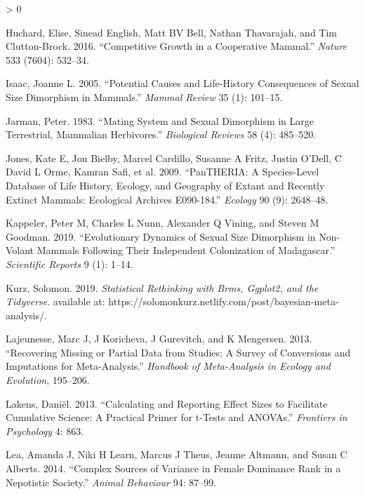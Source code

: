 \documentclass[
]{article}
\newlength{\cslhangindent}
\newenvironment{CSLReferences}[2] %
 {%
  \setlength{\parindent}{0pt}
  \ifodd #1 \everypar{\setlength{\hangindent}{\cslhangindent}}\ignorespaces\fi
  \ifnum #2 > 0
  \setlength{\parskip}{#2\baselineskip}
  \fi
 }%
 {}
\begin{document}
\begin{CSLReferences}{1}{0}
\leavevmode\hypertarget{ref-huchard2016competitive}{}%
Huchard, Elise, Sinead English, Matt BV Bell, Nathan Thavarajah, and Tim
Clutton-Brock. 2016. {``Competitive Growth in a Cooperative Mammal.''}
\emph{Nature} 533 (7604): 532--34.

\leavevmode\hypertarget{ref-isaac2005potential}{}%
Isaac, Joanne L. 2005. {``Potential Causes and Life-History Consequences
of Sexual Size Dimorphism in Mammals.''} \emph{Mammal Review} 35 (1):
101--15.

\leavevmode\hypertarget{ref-jarman1983mating}{}%
Jarman, Peter. 1983. {``Mating System and Sexual Dimorphism in Large
Terrestrial, Mammalian Herbivores.''} \emph{Biological Reviews} 58 (4):
485--520.

\leavevmode\hypertarget{ref-jones2009pantheria}{}%
Jones, Kate E, Jon Bielby, Marcel Cardillo, Susanne A Fritz, Justin
O'Dell, C David L Orme, Kamran Safi, et al. 2009. {``PanTHERIA: A
Species-Level Database of Life History, Ecology, and Geography of Extant
and Recently Extinct Mammals: Ecological Archives E090-184.''}
\emph{Ecology} 90 (9): 2648--48.

\leavevmode\hypertarget{ref-kappeler2019evolutionary}{}%
Kappeler, Peter M, Charles L Nunn, Alexander Q Vining, and Steven M
Goodman. 2019. {``Evolutionary Dynamics of Sexual Size Dimorphism in
Non-Volant Mammals Following Their Independent Colonization of
Madagascar.''} \emph{Scientific Reports} 9 (1): 1--14.

\leavevmode\hypertarget{ref-kurz2019rethinking}{}%
Kurz, Solomon. 2019. \emph{Statistical Rethinking with Brms, Ggplot2,
and the Tidyverse}. available at:
https://solomonkurz.netlify.com/post/bayesian-meta-analysis/.

\leavevmode\hypertarget{ref-lajeunesse2013recovering}{}%
Lajeunesse, Marc J, J Koricheva, J Gurevitch, and K Mengersen. 2013.
{``Recovering Missing or Partial Data from Studies: A Survey of
Conversions and Imputations for Meta-Analysis.''} \emph{Handbook of
Meta-Analysis in Ecology and Evolution}, 195--206.

\leavevmode\hypertarget{ref-lakens2013calculating}{}%
Lakens, Daniël. 2013. {``Calculating and Reporting Effect Sizes to
Facilitate Cumulative Science: A Practical Primer for t-Tests and
ANOVAs.''} \emph{Frontiers in Psychology} 4: 863.

\leavevmode\hypertarget{ref-lea2014complex}{}%
Lea, Amanda J, Niki H Learn, Marcus J Theus, Jeanne Altmann, and Susan C
Alberts. 2014. {``Complex Sources of Variance in Female Dominance Rank
in a Nepotistic Society.''} \emph{Animal Behaviour} 94: 87--99.


\end{CSLReferences}
\end{document}
